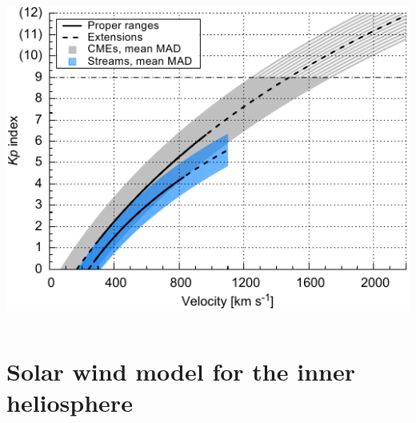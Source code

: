 \documentclass[11pt,aspectratio=1610]{beamer}	%
\newcommand{\captionoftiny}[2]{\captionof{#1}{\color{gray} \tiny #2}}
\begin{document}
\begin{frame}[c]{}{}
	\begin{columns}[c]
		
		\includegraphics[width=\textwidth]{../figures_of_mine/chapter2/Kp_2dhistogram_V_sws123_fit_f3.pdf}


	\end{columns}
\end{frame}


\section{Solar wind model for the inner heliosphere}
\end{document}
